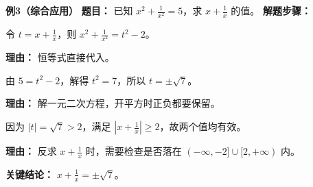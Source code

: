 \begin{examplebox}
	\medskip
	\textbf{\textcolor{CExample}{例3（综合应用）}}
	\textbf{\textcolor{CExample}{题目：}}
	已知 $x^2+\frac{1}{x^2}=5$，求 $x+\frac{1}{x}$ 的值。
	\textbf{\textcolor{CExample}{解题步骤：}}
	\begin{description}[style=nextline, leftmargin=2.8em, labelsep=0.5em, itemsep=0.45em]
		\item[\textbf{第一步（换元设定）：}]
		      令 $t=x+\frac{1}{x}$，则 $x^2+\frac{1}{x^2}=t^2-2$。
		      \par\textbf{理由：} 恒等式直接代入。
		\item[\textbf{第二步（列方程）：}]
		      由 $5=t^2-2$，解得 $t^2=7$，所以 $t=\pm\sqrt{7}$。
		      \par\textbf{理由：} 解一元二次方程，开平方时正负都要保留。
		\item[\textbf{第三步（验证范围）：}]
		      因为 $|t|=\sqrt{7}>2$，满足 $\left|x+\frac{1}{x}\right|\ge 2$，故两个值均有效。
		      \par\textbf{理由：} 反求 $x+\frac{1}{x}$ 时，需要检查是否落在 $(-\infty,-2]\cup[2,+\infty)$ 内。
	\end{description}
	\textbf{\textcolor{CExample}{关键结论：}}
	\textbf{$x+\frac{1}{x}=\pm\sqrt{7}$}。
\end{examplebox}